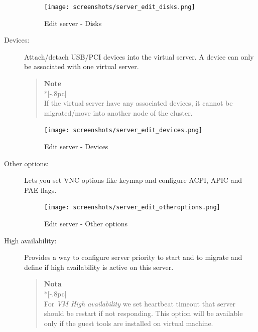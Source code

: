 \begin{description}
		\begin{figure}[H]
        		\begin{center}
		        \texttt{[image: screenshots/server\_edit\_disks.png]}
        		\caption{Edit server - Disks}
		        \label{fig:server_edit_disks}
	        	\end{center}
		\end{figure}
    \item[Devices:] Attach/detach USB/PCI devices into the virtual server. A device can only be associated with one virtual server. 
                \begin{quote}
                    {\large \bf Note} \\*[-.8pc]
                    \underline{\hspace{6in}} \\
                    If the virtual server have any associated devices, it cannot be migrated/move into another node of the cluster.
                \end{quote}
    
       \begin{figure}[H]
               \begin{center}
               \texttt{[image: screenshots/server\_edit\_devices.png]}
               \caption{Edit server - Devices}
               \label{fig:server_edit_devices}
               \end{center}
       \end{figure}

	\item[Other options:] Lets you set VNC options like keymap and configure ACPI, APIC and PAE flags.


		\begin{figure}[H]
        		\begin{center}
		        \texttt{[image: screenshots/server\_edit\_otheroptions.png]}
        		\caption{Edit server - Other options}
	        	\label{fig:server_edit_otheroptions}
	        	\end{center}
		\end{figure}

	\item[High availability:] Provides a way to configure server priority to start and to migrate and define if high availability is active on this server.


                \begin{quote}
                    {\large \bf Nota} \\*[-.8pc]
                    \underline{\hspace{6in}} \\
                    For \emph{VM High availability} we set heartbeat timeout that server should be restart if not responding.
                        This option will be available only if the guest tools are installed on virtual machine.
                \end{quote}
                    

\end{description}
